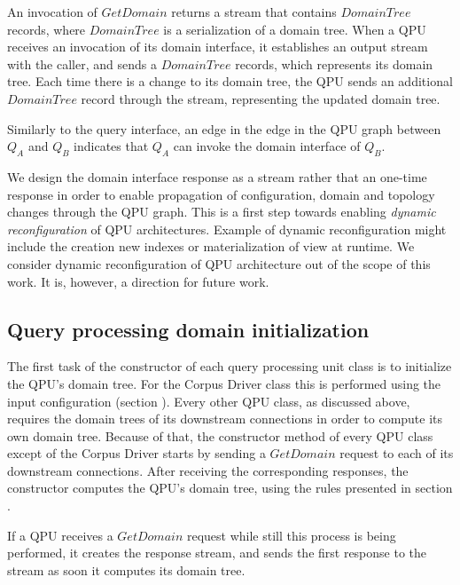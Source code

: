 An invocation of $GetDomain$ returns a stream that contains $DomainTree$ records, where $DomainTree$ is a serialization of a domain tree.
When a QPU receives an invocation of its domain interface, it establishes an output stream with the caller,
and sends a $DomainTree$ records, which represents its domain tree.
Each time there is a change to its domain tree, the QPU sends an additional $DomainTree$ record through the stream,
representing the updated domain tree.

Similarly to the query interface, an edge in the edge in the QPU graph between $Q_A$ and $Q_B$ indicates that $Q_A$ can
invoke the domain interface of $Q_B$.

\medskip
\noindent
We design the domain interface response as a stream rather that an one-time response in order to enable propagation of
configuration, domain and topology changes through the QPU graph.
This is a first step towards enabling \textit{dynamic reconfiguration} of QPU architectures.
Example of dynamic reconfiguration might include the creation new indexes or materialization of view at runtime.
We consider dynamic reconfiguration of QPU architecture out of the scope of this work.
It is, however, a direction for future work.

\subsection{Query processing domain initialization}

The first task of the constructor of each query processing unit class is to initialize the QPU's domain tree.
For the Corpus Driver class this is performed using the input configuration (section \todo{}).
Every other QPU class, as discussed above, requires the domain trees of its downstream connections in order to compute its own domain tree.
Because of that, the constructor method of every QPU class except of the Corpus Driver starts by sending a $GetDomain$ request to each
of its downstream connections.
After receiving the corresponding responses, the constructor computes the QPU's domain tree, using the rules presented in section .

If a QPU receives a $GetDomain$ request while still this process is being performed, it creates the response stream,
and sends the first response to the stream as soon it computes its domain tree.

